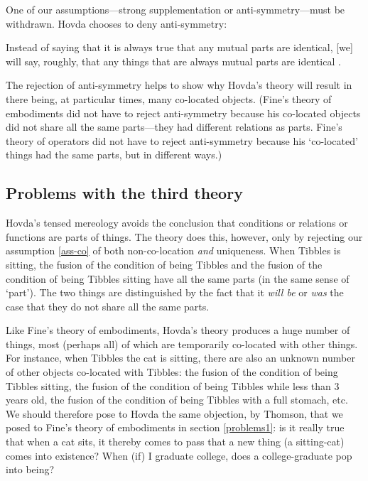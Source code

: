 \documentclass[11pt]{article}
\newenvironment{squote}{%
\begin{spacing}{1}
\begin{list}{}{%
\setlength{\labelwidth}{0pt}%
\rightmargin\leftmargin%
}
\item\relax
}{%
\end{list}%
\end{spacing}
}
\begin{document}
\begin{spacing}{1.5}
One of our assumptions---strong supplementation or
anti-symmetry---must be withdrawn.  Hovda chooses to deny
anti-symmetry:

\begin{squote}
Instead of saying that it is always true that any mutual parts are
identical, [we] will say, roughly, that any things that are always
mutual parts are identical \citep[sec. 3.1.2]{hovda2011}.
\end{squote}

The rejection of anti-symmetry helps to show why Hovda's theory will
result in there being, at particular times, many co-located objects.
(Fine's theory of embodiments did not have to reject anti-symmetry
because his co-located objects did not share all the same parts---they
had different relations as parts.  Fine's theory of operators did not
have to reject anti-symmetry because his `co-located' things had the
same parts, but in different ways.)

\subsection{Problems with the third theory}
\label{problems3}
Hovda's tensed mereology avoids the conclusion that conditions or
relations or functions are parts of things.  The theory does this,
however, only by rejecting our assumption \ref{ass-co} of both
non-co-location {\em and} uniqueness.  When Tibbles is sitting, the
fusion of the condition of being Tibbles and the fusion of the
condition of being Tibbles sitting have all the same parts (in the
same sense of `part').  The two things are distinguished by the fact
that it {\em will be} or {\em was} the case that they do not share all
the same parts.

Like Fine's theory of embodiments, Hovda's theory produces a huge
number of things, most (perhaps all) of which are temporarily
co-located with other things.  For instance, when Tibbles the cat is
sitting, there are also an unknown number of other objects co-located
with Tibbles: the fusion of the condition of being Tibbles sitting,
the fusion of the condition of being Tibbles while less than 3 years
old, the fusion of the condition of being Tibbles with a full stomach,
etc.  We should therefore pose to Hovda the same objection, by
Thomson, that we posed to Fine's theory of embodiments in section
\ref{problems1}: is it really true that when a cat sits, it thereby
comes to pass that a new thing (a sitting-cat) comes into existence?
When (if) I graduate college, does a college-graduate pop into being?


\end{spacing}
\end{document}
